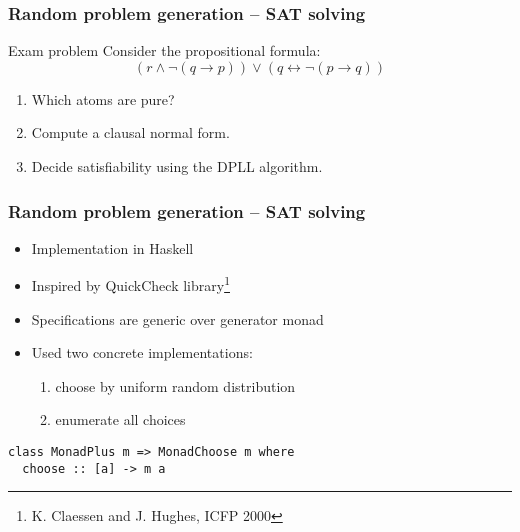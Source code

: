 \documentclass[xcolor={table}]{beamer}
\newcommand{\limpl}{\rightarrow}
\newcommand{\liff}{\leftrightarrow}
\begin{document}


\begin{frame}
    \frametitle{Random problem generation -- SAT solving}

    \begin{block}{Exam problem}
        Consider the propositional formula:
        \[
            (r \land \lnot (q \limpl p)) \lor (q \liff \lnot (p \limpl q))
        \]
        \vspace*{-1.5em}
        \begin{enumerate}
            \item Which atoms are pure?
            \item Compute a clausal normal form.
            \item Decide satisfiability using the DPLL algorithm.
        \end{enumerate}
    \end{block}
\end{frame}


\begin{frame}[fragile]
    \frametitle{Random problem generation -- SAT solving}

    \begin{itemize}
        \item
            Implementation in Haskell
        \item
            Inspired by QuickCheck library\footnote{K. Claessen and J. Hughes, ICFP 2000}
        \item
            Specifications are generic over generator monad
        \item
            Used two concrete implementations:

            \begin{enumerate}
                \item choose by uniform random distribution
                \item enumerate all choices
            \end{enumerate}
    \end{itemize}

    \bigskip

\begin{lstlisting}
class MonadPlus m => MonadChoose m where
  choose :: [a] -> m a
\end{lstlisting}
\end{frame}
\end{document}
